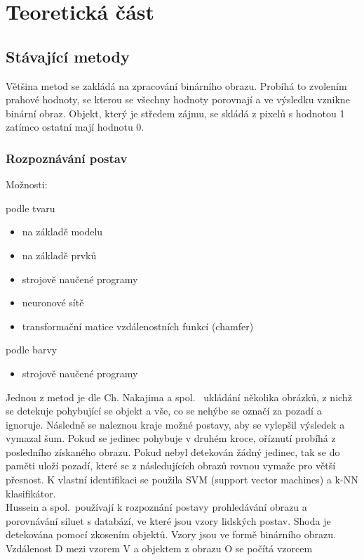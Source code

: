 \chapter{Teoretická část}

\section{Stávající metody}
Většina metod se zakládá na zpracování binárního obrazu. Probíhá to zvolením prahové hodnoty, se kterou se všechny hodnoty porovnají a ve výsledku vznikne binární obraz. Objekt, který je středem zájmu, se skládá z pixelů s hodnotou 1 zatímco ostatní mají hodnotu 0.

\subsection{Rozpoznávání postav}
Možnosti:

podle tvaru
\begin{itemize}
\item na základě modelu
\item na základě prvků

\item strojově naučené programy
\item neuronové sítě %
\item transformační matice vzdálenostních funkcí (chamfer)
\end{itemize}

podle barvy
\begin{itemize}
\item strojově naučené programy\\
\end{itemize}


Jednou z metod je dle Ch. Nakajima a spol.~\cite{6} ukládání několika obrázků, z nichž se detekuje pohybující se objekt a vše, co se nehýbe se označí za pozadí a ignoruje. Následně se naleznou kraje možné postavy, aby se vylepšil výsledek a vymazal šum. Pokud se jedinec pohybuje v druhém kroce, oříznutí probíhá z posledního získaného obrazu. Pokud nebyl detekován žádný jedinec, tak se do paměti uloží pozadí, které se z následujících obrazů rovnou vymaže pro větší přesnost. K vlastní identifikaci se použila SVM (support vector machines) a k-NN klasifikátor.\\

Hussein a spol.~\cite{9}používají k rozpoznání postavy prohledávání obrazu a porovnávání siluet s databází, ve které jsou vzory lidských postav. Shoda je detekována pomocí zkosením objektů. Vzory jsou ve formě binárního obrazu. Vzdálenost D mezi vzorem V a objektem z obrazu O se počítá vzorcem\\

